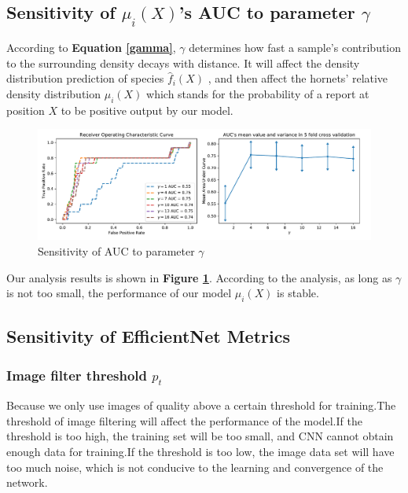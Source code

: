 \documentclass[12pt]{article}
\begin{document}
\subsection{Sensitivity of $\mu_i(X)$'s AUC to parameter $\gamma$}
According to \textbf{Equation \ref{gamma}}, $\gamma$ determines how fast a sample's contribution to the surrounding density decays with distance. It will affect the density distribution prediction of species $\hat{f}_i(X)$ , and then affect the hornets' relative density distribution $\mu_i(X)$ which stands for the probability of a report at position $X$ to be positive output by our model. 

\begin{figure}[H]%
	\small
	\centering
	\includegraphics[width=17cm]{./pictures/mean_roc_auc_by_gamma.pdf}
	\caption{Sensitivity of AUC to parameter $\gamma$}\label{mean_roc_auc_by_gamma}
\end{figure}
Our analysis results is shown in \textbf{Figure \ref{mean_roc_auc_by_gamma}}. According to the analysis, as long as $\gamma$ is not too small, the performance of our model $\mu_i(X)$ is stable.

\subsection{Sensitivity of EfficientNet Metrics }
\subsubsection{Image filter threshold $p_t$}
Because we only use images of quality above a certain threshold for training.The threshold of image filtering will affect the performance of the model.If the threshold is too high, the training set will be too small, and CNN cannot obtain enough data for training.If the threshold is too low, the image data set will have too much noise, which is not conducive to the learning and convergence of the network.
\end{document}
